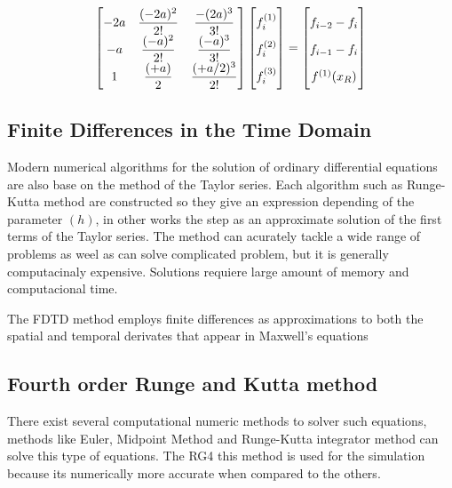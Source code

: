 \begin{align} \label{eq:matrix3}
\begin{bmatrix}
    -2a & \dfrac{(-2a)^2}{2!} & \dfrac{-(2a)^3}{3!}\\
    -a & \dfrac{(-a)^2}{2!} & \dfrac{(-a)^3}{3!}\\
    1 & \dfrac{(+a)}{2} & \dfrac{(+a/2)^3}{2!}
\end{bmatrix}
\begin{bmatrix}
    f_i^{(1)}  \vphantom{ \dfrac{d^4}{d} }\\
    f_i^{(2)}  \vphantom{ \dfrac{d^4}{d} } \\
    f_i^{(3)}  \vphantom{ \dfrac{d^4}{d} }
\end{bmatrix}
=
\begin{bmatrix}
    f_{i-2} - f_{i}    \vphantom{ \dfrac{d^4}{d}} \\
    f_{i-1} - f_{i}    \vphantom{ \dfrac{d^4}{d}} \\
    f^{(1)}(x_R)   \vphantom{ \dfrac{d^4}{d}}
\end{bmatrix}
\end{align}


\cite{methods}

\subsection{Finite Differences in the Time Domain}

Modern numerical algorithms for the solution of ordinary differential equations are also base on the method of the Taylor series. Each algorithm such as Runge-Kutta method are constructed so they give an expression depending of the parameter $(h)$, in other works the step as an approximate solution of the first terms of the Taylor series. \cite{ufdtd}
The method can acurately tackle a wide range of problems as weel as can solve complicated problem, but it is generally computacinaly expensive. Solutions requiere large amount of memory and computacional time. 

The FDTD method employs finite differences as approximations to both the spatial and temporal derivates that appear in Maxwell's equations


\subsection{Fourth order Runge and Kutta method}

There exist several computational numeric methods to solver such equations, methods like Euler, Midpoint Method and Runge-Kutta integrator method can solve this type of equations. The RG4 this method is used for the simulation because its numerically more accurate when compared to the others.

